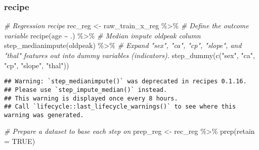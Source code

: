 \documentclass[
]{book}
\newenvironment{Shaded}{\begin{snugshade}}{\end{snugshade}}
\newcommand{\AttributeTok}[1]{\textcolor[rgb]{0.77,0.63,0.00}{#1}}
\newcommand{\CommentTok}[1]{\textcolor[rgb]{0.56,0.35,0.01}{\textit{#1}}}
\newcommand{\ConstantTok}[1]{\textcolor[rgb]{0.00,0.00,0.00}{#1}}
\newcommand{\FunctionTok}[1]{\textcolor[rgb]{0.00,0.00,0.00}{#1}}
\newcommand{\NormalTok}[1]{#1}
\newcommand{\OtherTok}[1]{\textcolor[rgb]{0.56,0.35,0.01}{#1}}
\newcommand{\SpecialCharTok}[1]{\textcolor[rgb]{0.00,0.00,0.00}{#1}}
\newcommand{\StringTok}[1]{\textcolor[rgb]{0.31,0.60,0.02}{#1}}
\begin{document}
\hypertarget{recipe}{%
\subsubsection{recipe}\label{recipe}}

\begin{Shaded}
\begin{Highlighting}[]
\CommentTok{\# Regression recipe}
\NormalTok{rec\_reg }\OtherTok{\textless{}{-}}\NormalTok{ raw\_train\_x\_reg }\SpecialCharTok{\%\textgreater{}\%}
  \CommentTok{\# Define the outcome variable}
  \FunctionTok{recipe}\NormalTok{(age }\SpecialCharTok{\textasciitilde{}}\NormalTok{ .) }\SpecialCharTok{\%\textgreater{}\%}
  \CommentTok{\# Median impute oldpeak column}
  \FunctionTok{step\_medianimpute}\NormalTok{(oldpeak) }\SpecialCharTok{\%\textgreater{}\%}
  \CommentTok{\# Expand "sex", "ca", "cp", "slope", and "thal" features out into dummy variables (indicators).}
  \FunctionTok{step\_dummy}\NormalTok{(}\FunctionTok{c}\NormalTok{(}\StringTok{"sex"}\NormalTok{, }\StringTok{"ca"}\NormalTok{, }\StringTok{"cp"}\NormalTok{, }\StringTok{"slope"}\NormalTok{, }\StringTok{"thal"}\NormalTok{))}
\end{Highlighting}
\end{Shaded}

\begin{verbatim}
## Warning: `step_medianimpute()` was deprecated in recipes 0.1.16.
## Please use `step_impute_median()` instead.
## This warning is displayed once every 8 hours.
## Call `lifecycle::last_lifecycle_warnings()` to see where this warning was generated.
\end{verbatim}

\begin{Shaded}
\begin{Highlighting}[]
\CommentTok{\# Prepare a dataset to base each step on}
\NormalTok{prep\_reg }\OtherTok{\textless{}{-}}\NormalTok{ rec\_reg }\SpecialCharTok{\%\textgreater{}\%} \FunctionTok{prep}\NormalTok{(}\AttributeTok{retain =} \ConstantTok{TRUE}\NormalTok{)}
\end{Highlighting}
\end{Shaded}
\end{document}
